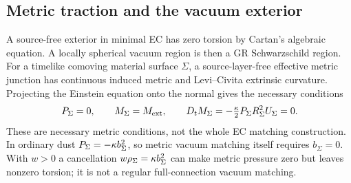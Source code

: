 \subsection{Metric traction and the vacuum exterior}
A source-free exterior in minimal EC has zero torsion by Cartan's algebraic equation. A locally spherical vacuum region is then a GR Schwarzschild region. For a timelike comoving material surface $\Sigma$, a source-layer-free effective metric junction has continuous induced metric and Levi--Civita extrinsic curvature. Projecting the Einstein equation onto the normal gives the necessary conditions
\begin{equation}
 P_\Sigma=0,\qquad M_\Sigma=M_{\rm ext},\qquad
 D_t M_\Sigma=-\tfrac{\kappa}2P_\Sigma R_\Sigma^2 U_\Sigma=0.
\end{equation}
These are necessary metric conditions, not the whole EC matching construction. In ordinary dust $P_\Sigma=-\kappa b_\Sigma^2$, so metric vacuum matching itself requires $b_\Sigma=0$. With $w>0$ a cancellation $w\rho_\Sigma=\kappa b_\Sigma^2$ can make metric pressure zero but leaves nonzero torsion; it is not a regular full-connection vacuum matching.

